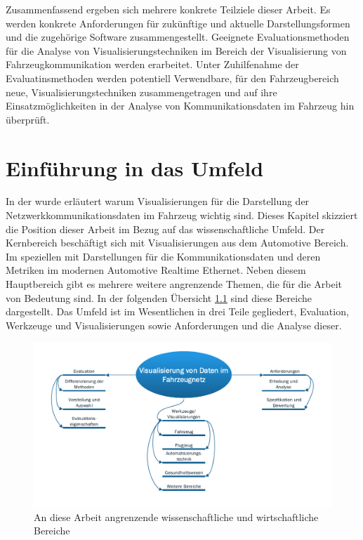 \documentclass[draft=false
              ,paper=a4
              ,twoside=false
              ,fontsize=11pt
              ,headsepline
              ,BCOR10mm
              ,DIV11
              ]{scrbook}
\begin{document}
Zusammenfassend ergeben sich mehrere konkrete Teilziele dieser Arbeit. Es werden konkrete Anforderungen für zukünftige und aktuelle Darstellungsformen und die zugehörige Software zusammengestellt. Geeignete Evaluationsmethoden für die Analyse von Visualisierungstechniken im Bereich der Visualisierung von Fahrzeugkommunikation werden erarbeitet. Unter Zuhilfenahme der Evaluatinsmethoden werden potentiell Verwendbare, für den Fahrzeugbereich neue, Visualisierungstechniken zusammengetragen und auf ihre Einsatzmöglichkeiten in der Analyse von Kommunikationsdaten im Fahrzeug hin überprüft.

\chapter{Einführung in das Umfeld} %
\label{cha:einfuhrung_in_das_umfeld}
In der  wurde erläutert warum Visualisierungen für die Darstellung der Netzwerkkommunikationsdaten im Fahrzeug wichtig sind. Dieses Kapitel skizziert die Position dieser Arbeit im Bezug auf das wissenschaftliche Umfeld. Der Kernbereich beschäftigt sich mit Visualisierungen aus dem Automotive Bereich. Im speziellen mit Darstellungen für die Kommunikationsdaten und deren Metriken im modernen Automotive Realtime Ethernet. Neben diesem Hauptbereich gibt es mehrere weitere angrenzende Themen, die für die Arbeit von Bedeutung sind. In der folgenden Übersicht \ref{fig:theme_overview} sind diese Bereiche dargestellt. Das Umfeld ist im Wesentlichen in drei Teile gegliedert, Evaluation, Werkzeuge und Visualisierungen sowie Anforderungen und die Analyse dieser. 

\begin{figure}[htbp]
  \centering
  \includegraphics[width=\textwidth]{img/theme_overview.pdf}
  \caption{An diese Arbeit angrenzende wissenschaftliche und wirtschaftliche Bereiche}
  \label{fig:theme_overview}
\end{figure}
\end{document}
